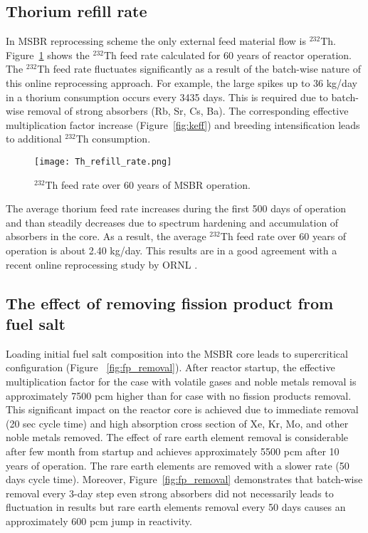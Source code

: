 \subsection{Thorium refill rate}
In \gls{MSBR} reprocessing scheme the only external feed material flow  is 
$^{232}$Th. Figure~\ref{fig:th_refill} shows the $^{232}$Th feed rate 
calculated for 60 years of reactor operation. The $^{232}$Th feed rate 
fluctuates significantly as a result of the batch-wise nature of this online 
reprocessing approach. For example, the large spikes up to 36 kg/day in a 
thorium consumption occurs every 3435 days. This is required due to batch-wise 
removal of strong absorbers (Rb, Sr, Cs, Ba). The corresponding effective 
multiplication factor increase (Figure~\ref{fig:keff}) and breeding 
intensification leads to additional $^{232}$Th consumption.  
\begin{figure}[ht!] %
  \texttt{[image: Th\_refill\_rate.png]} \caption{$^{232}$Th 
  feed rate over 60 years of \gls{MSBR} operation.}
  \label{fig:th_refill}
\end{figure}

The average thorium feed rate increases during the first 500 days of operation 
and than steadily decreases due to spectrum hardening and accumulation of 
absorbers in the core. As a result, the average $^{232}$Th feed rate over 60 
years of operation is about 2.40 kg/day. This results are in a good agreement 
with a recent online reprocessing study by \gls{ORNL} 
\cite{betzler_molten_2017}.

\subsection{The effect of removing fission product from fuel salt}
Loading initial fuel salt composition into the \gls{MSBR} core leads to 
supercritical configuration (Figure ~\ref{fig:fp_removal}). After reactor 
startup, the effective multiplication factor for the case with volatile gases 
and noble metals removal is approximately 7500 pcm  higher than for case with 
no fission products removal. This significant impact on the reactor core is
achieved due to immediate removal (20 sec cycle time) and high absorption cross 
section of Xe, Kr, Mo, and other noble metals removed. The effect of rare earth 
element removal is considerable after few month from startup and achieves 
approximately 5500 pcm after 10 years of operation. The rare earth elements are 
removed with a slower rate (50 days cycle time). Moreover, 
Figure~\ref{fig:fp_removal} demonstrates that batch-wise removal every 3-day 
step even strong absorbers did not necessarily leads to fluctuation in results 
but rare earth elements removal every 50 days causes an approximately 600 pcm jump 
in reactivity.

